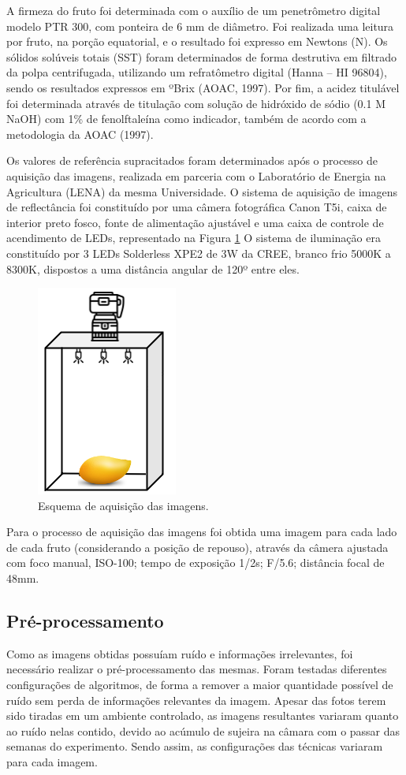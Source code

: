 A firmeza do fruto foi determinada com o auxílio de um penetrômetro digital modelo PTR 300, com ponteira de 6 mm de diâmetro. Foi realizada uma leitura por fruto, na porção equatorial, e o resultado foi expresso em Newtons (N). Os sólidos solúveis totais (SST) foram determinados de forma destrutiva em filtrado da polpa centrifugada, utilizando um refratômetro digital (Hanna – HI 96804), sendo os resultados expressos em ºBrix (AOAC, 1997). Por fim, a acidez titulável foi determinada através de titulação com solução de hidróxido de sódio (0.1 M NaOH) com 1\% de fenolftaleína como indicador, também de acordo com a metodologia da AOAC (1997). 

Os valores de referência supracitados foram determinados após o processo de aquisição das imagens, realizada em parceria com o Laboratório de Energia na Agricultura (LENA) da mesma Universidade. O sistema de aquisição de imagens de reflectância foi constituído por uma câmera fotográfica Canon T5i, caixa de interior preto fosco, fonte de alimentação ajustável e uma caixa de controle de acendimento de LEDs, representado na Figura \ref{fig:caixa} O sistema de iluminação era constituído por 3 LEDs Solderless XPE2 de 3W da CREE, branco frio 5000K a 8300K, dispostos a uma distância angular de 120º entre eles. 

\begin{figure}[!htb]
\centering
    \includegraphics[scale=0.7]{imgs/mangobox.png}
    \caption{Esquema de aquisição das imagens.}\label{fig:caixa}
\end{figure}

Para o processo de aquisição das imagens foi obtida uma imagem para cada lado de cada fruto (considerando a posição de repouso), através da câmera ajustada com foco manual, ISO-100; tempo de exposição 1/2s; F/5.6; distância focal de 48mm.

\subsection{Pré-processamento}
Como as imagens obtidas possuíam ruído e informações irrelevantes, foi necessário realizar o pré-processamento das mesmas. Foram testadas diferentes configurações de algoritmos, de forma a remover a maior quantidade possível de ruído sem perda de informações relevantes da imagem. Apesar das fotos terem sido tiradas em um ambiente controlado, as imagens resultantes variaram quanto ao ruído nelas contido, devido ao acúmulo de sujeira na câmara com o passar das semanas do experimento. Sendo assim, as configurações das técnicas variaram para cada imagem.

